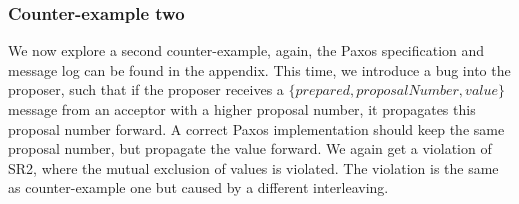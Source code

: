 \subsubsection{Counter-example two}
We now explore a second counter-example, again, the Paxos specification and message log can be found in the appendix. This time, we introduce a bug into the proposer, such that if the proposer receives a $\{prepared, proposalNumber, value\}$ message from an acceptor with a higher proposal number, it propagates this proposal number forward. A correct Paxos implementation should keep the same proposal number, but propagate the value forward. We again get a violation of SR2, where the mutual exclusion of values is violated. The violation is the same as counter-example one but caused by a different interleaving. 
\\ \\
